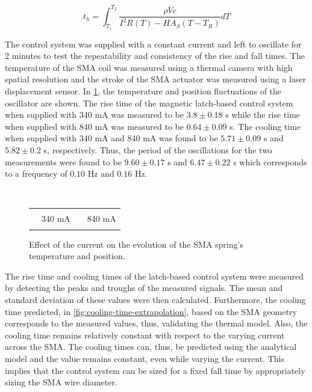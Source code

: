 \begin{equation}\label{eq:heatingtime}
  t_h = \int_{T_1}^{T_2} \frac{\rho Vc}{I^2R(T)-HA_S(T-T_R)} dT
\end{equation}

The control system was supplied with a constant current and left to oscillate for 2 minutes to test the repeatability and consistency of the rise and fall times. The temperature of the SMA coil was measured using a thermal camera with high spatial resolution and the stroke of the SMA actuator was measured using a laser displacement sensor. In \cref{fig:thermal-osc}, the temperature and position fluctuations of the oscillator are shown. The rise time of the magnetic latch-based control system when supplied with $340$ mA was measured to be $3.8 \pm 0.18$ s while the rise time when supplied with $840$ mA was measured to be $0.64 \pm 0.09$ s. The cooling time when supplied with $340$ mA and $840$ mA was found to be $5.71 \pm 0.09$ s and $5.82 \pm 0.2$ s, respectively. Thus, the period of the oscillations for the two measurements were found to be $9.60 \pm 0.17$ s and $6.47 \pm 0.22$ s which corresponds to a frequency of $0.10$ Hz and $0.16$ Hz.

\begin{figure}[htb!] %
  \centering
  \begin{subfigure}[b]{\textwidth}
      \centering
      \resizebox{0.75\textwidth}{!}{}
  \end{subfigure}
  ~
  \begin{subfigure}[b]{\textwidth}
      \centering
      \resizebox{0.75\textwidth}{!}{}
  \end{subfigure}
  \begin{tabular}{r@{ }l r@{ }l}
    {\color{myblue} \rule[2pt]{10pt}{0.5mm} } & 340 mA & {\color{myred} \rule[2pt]{10pt}{0.5mm} } & 840 mA
  \end{tabular}
  \caption{Effect of the current on the evolution of the SMA spring's temperature and position.}
  \label{fig:thermal-osc}
\end{figure}

The rise time and cooling times of the latch-based control system were measured by detecting the peaks and troughs of the measured signals. The mean and standard deviation of these values were then calculated. Furthermore, the cooling time predicted, in \cref{fig:cooling-time-extrapolation}, based on the SMA geometry corresponds to the measured values, thus, validating the thermal model. Also, the cooling time remains relatively constant with respect to the varying current across the SMA. The cooling times can, thus, be predicted using the analytical model and the value remains constant, even while varying the current. This implies that the control system can be sized for a fixed fall time by appropriately sizing the SMA wire diameter.

